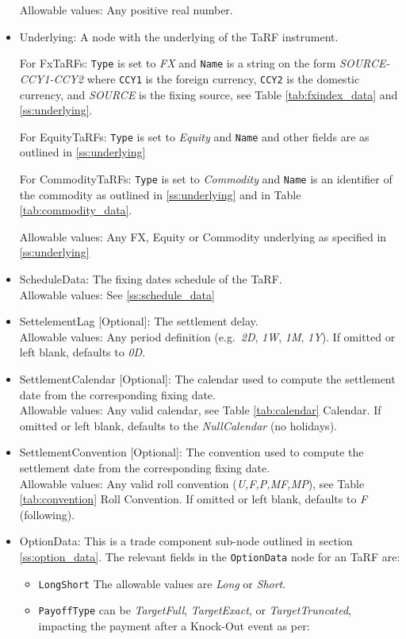 \begin{itemize}
      Allowable values: Any positive real number. 
    \item Underlying: A node with the underlying of the TaRF instrument.

For FxTaRFs: \lstinline!Type! is set to \emph{FX} and \lstinline!Name! is a string on the form \emph{SOURCE-CCY1-CCY2} where \lstinline!CCY1! is the foreign currency, \lstinline!CCY2! is the domestic currency, and \emph{SOURCE} is the fixing source, see Table \ref{tab:fxindex_data} and  \ref{ss:underlying}.

For EquityTaRFs: \lstinline!Type! is set to \emph{Equity} and \lstinline!Name! and other fields are as outlined in \ref{ss:underlying}

For CommodityTaRFs: \lstinline!Type! is set to \emph{Commodity} and \lstinline!Name! is an identifier of the commodity as outlined in \ref{ss:underlying} and in Table \ref{tab:commodity_data}.

      Allowable values: Any FX, Equity or Commodity underlying as specified in \ref{ss:underlying}
    \item ScheduleData: The fixing dates schedule of the TaRF.\\
      Allowable values: See \ref{ss:schedule_data}
    \item SettelementLag [Optional]: The settlement delay. \\
      Allowable values: Any period definition (e.g.\ \emph{2D}, \emph{1W}, \emph{1M}, \emph{1Y}). If omitted or left blank, defaults to \emph{0D}.
    \item SettlementCalendar [Optional]: The calendar used to compute the settlement date from the corresponding fixing date. \\
      Allowable values: Any valid calendar, see Table \ref{tab:calendar} Calendar. If omitted or left blank, defaults to the \emph{NullCalendar} (no holidays).
    \item SettlementConvention [Optional]: The convention used to compute the settlement date from the corresponding fixing date. \\
      Allowable values: Any valid roll convention (\emph{U,F,P,MF,MP}), see Table \ref{tab:convention} Roll Convention. If omitted or left blank, defaults to \emph{F} (following).
    \item OptionData: This is a trade component sub-node outlined in section \ref{ss:option_data}. 
The relevant fields in the \lstinline!OptionData! node for an TaRF are:

\begin{itemize}
\item \lstinline!LongShort! The allowable values are \emph{Long} or \emph{Short}.
\item \lstinline!PayoffType! can be \emph{TargetFull}, \emph{TargetExact}, or \emph{TargetTruncated}, impacting the payment after a Knock-Out event as per:
      

\end{itemize}
\end{itemize}
